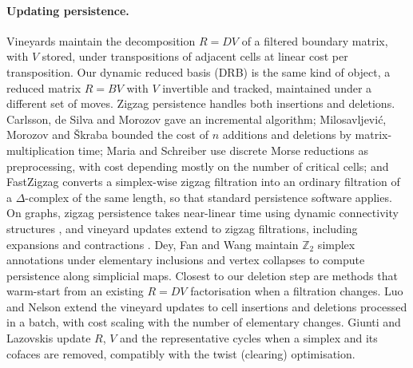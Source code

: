 \paragraph{Updating persistence.}
Vineyards \cite{cohensteiner2006vines} maintain the decomposition $R = DV$ of
a filtered boundary matrix, with $V$ stored, under transpositions of adjacent
cells at linear cost per transposition. Our dynamic reduced basis (DRB) is the
same kind of object, a reduced matrix $R = BV$ with $V$ invertible and
tracked, maintained under a different set of moves. Zigzag persistence
\cite{carlsson2010zigzag} handles both insertions and deletions. Carlsson, de
Silva and Morozov \cite{carlsson2009zigzag} gave an incremental algorithm;
Milosavljevi\'c, Morozov and \v{S}kraba \cite{milosavljevic2011zigzag} bounded
the cost of $n$ additions and deletions by matrix-multiplication time; Maria
and Schreiber \cite{maria2024discrete} use discrete Morse reductions as
preprocessing, with cost depending mostly on the number of critical cells; and
FastZigzag \cite{dey2022fast} converts a simplex-wise zigzag filtration into
an ordinary filtration of a $\Delta$-complex of the same length, so that
standard persistence software applies. On graphs, zigzag persistence takes
near-linear time using dynamic connectivity structures \cite{dey2021zigzag},
and vineyard updates extend to zigzag filtrations, including expansions and
contractions \cite{dey2024vineyard}. Dey, Fan and Wang
\cite{dey2014simplicial} maintain $\mathbb{Z}_2$ simplex annotations under
elementary inclusions and vertex collapses to compute persistence along
simplicial maps. Closest to our deletion step are methods that warm-start from
an existing $R = DV$ factorisation when a filtration changes. Luo and Nelson
\cite{luo2023warmstart} extend the vineyard updates to cell insertions and
deletions processed in a batch, with cost scaling with the number of
elementary changes. Giunti and Lazovskis \cite{giunti2026pruning} update $R$,
$V$ and the representative cycles when a simplex and its cofaces are removed,
compatibly with the twist (clearing) optimisation.

